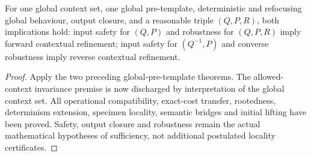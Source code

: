 



\begin{lemma}
For one global context set, one global pre-template, deterministic and refocusing global behaviour, output closure, and a reasonable triple $(Q,P,R)$, both implications hold: input safety for $(Q,P)$ and robustness for $(Q,P,R)$ imply forward contextual refinement; input safety for $(Q^{-1},P)$ and converse robustness imply reverse contextual refinement.
\end{lemma}

\begin{proof}
Apply the two preceding global-pre-template theorems. The allowed-context invariance premise is now discharged by interpretation of the global context set. All operational compatibility, exact-cost transfer, rootedness, determinism extension, specimen locality, semantic bridges and initial lifting have been proved. Safety, output closure and robustness remain the actual mathematical hypotheses of sufficiency, not additional postulated locality certificates.
\end{proof}

